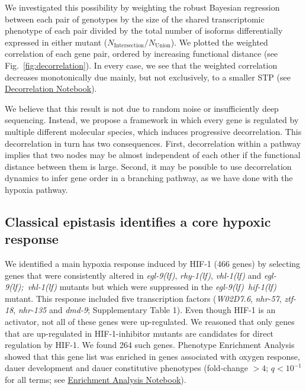 \documentclass[9pt,twocolumn,twoside]{pnas-new}
\newcommand{\qval}[1]{$q<10^{-#1}$}
\newcommand{\gene}[1]{\mbox{\emph{#1}}}
\newcommand{\nhr}{\gene{nhr-57}}
\newcommand{\egl}{\gene{egl-9(lf)}}
\newcommand{\rhy}{\gene{rhy-1(lf)}}
\newcommand{\vhl}{\gene{vhl-1(lf)}}
\newcommand{\eglvhl}{\gene{egl-9(lf); vhl-1(lf)}}
\newcommand{\eglhif}{\gene{egl-9(lf) hif-1(lf)}}
\newcommand{\hifp}{HIF-1}
\newcommand{\hiftargets}{264}
\begin{document}
We investigated this possibility by weighting the robust Bayesian regression
between each pair of genotypes by the size of the shared transcriptomic
phenotype of each pair divided by the total number of isoforms differentially
expressed in either mutant ($N_\mathrm{Intersection}/N_{\mathrm{Union}}$). We
plotted the weighted correlation of each gene pair, ordered by increasing
functional distance (see Fig.~\ref{fig:decorrelation}). In every case, we see
that the weighted correlation decreases monotonically due mainly, but not
exclusively, to a smaller STP (see
\href{https://wormlabcaltech.github.io/mprsq/analysis_notebooks/10_decorrelation.html}
{Decorrelation Notebook}).

We believe that this result is not due to random noise or insufficiently deep
sequencing. Instead, we propose a framework in which every gene is regulated by
multiple different molecular species, which induces progressive decorrelation.
This decorrelation in turn has two consequences. First, decorrelation within a
pathway implies that two nodes may be almost independent of each other if the
functional distance between them is large. Second, it may be possible to use
decorrelation dynamics to infer gene order in a branching pathway, as we have
done with the hypoxia pathway.

\subsection{Classical epistasis identifies a core hypoxic response}
We identified a main hypoxia response induced by \hifp{} (466 genes) by
selecting genes that were consistently altered in \egl{}, \rhy{}, \vhl{} and
\eglvhl{} mutants but which were suppressed in the \eglhif{} mutant. This
response included five transcription factors (\gene{W02D7.6}, \nhr{},
\gene{ztf-18}, \gene{nhr-135} and \gene{dmd-9}; Supplementary Table 1). Even
though \hifp{} is an activator, not all of these genes were up-regulated. We
reasoned that only genes that are up-regulated in \hifp{}-inhibitor mutants are
candidates for direct regulation by \hifp{}. We found \hiftargets{} such genes.
Phenotype Enrichment Analysis~\cite{Angeles-Albores106369} showed that this gene
list was enriched in genes associated with oxygen response, dauer development
and dauer constitutive phenotypes (fold-change $>4$; \qval{1} for all terms;
see
\href{https://wormlabcaltech.github.io/mprsq/analysis_notebooks/3_ea_of_hypoxia_data.html}
{Enrichment Analysis Notebook}).
\end{document}
